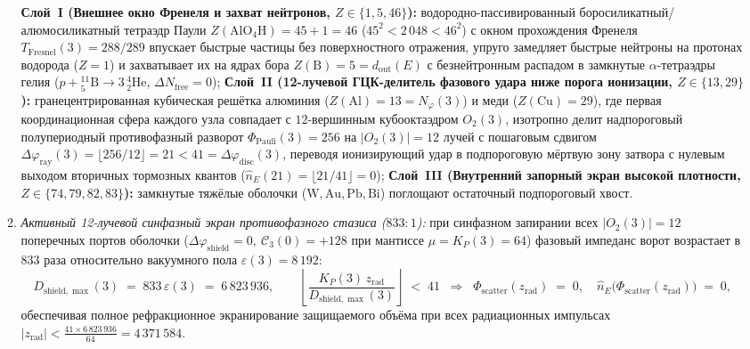 \begin{theorem}[Резонансный замок седла $120 + 8 = 128 = Q_\square(3)$, барьер оболочечной пассивации $45^2 < 2\,048 < 46^2$, окно Френеля $288/289$ и безветвевая кремниевая архитектура в беспотерьном коридоре]
\begin{enumerate}[label=\textbf{(\arabic*)},leftmargin=*]
\begin{enumerate}[label=\textbf{(\alph*)},leftmargin=*]
    \textbf{Слой~I (Внешнее окно Френеля и захват нейтронов, $Z \in \{1, 5, 46\}$):} водородно-пассивированный боросиликатный/алюмосиликатный тетраэдр Паули $Z(\mathrm{AlO_4H}) = 45 + 1 = 46$ ($45^2 < 2\,048 < 46^2$) с окном прохождения Френеля $T_{\mathrm{Fresnel}}(3) = 288/289$ впускает быстрые частицы без поверхностного отражения, упруго замедляет быстрые нейтроны на протонах водорода ($Z = 1$) и захватывает их на ядрах бора $Z(\mathrm{B}) = 5 = d_{\mathrm{out}}(E)$ с безнейтронным распадом в замкнутые $\alpha$-тетраэдры гелия ($p + {}^{11}_5\mathrm{B} \to 3\,{}^4_2\mathrm{He}$, $\Delta N_{\mathrm{free}} = 0$);
    \textbf{Слой~II (12-лучевой ГЦК-делитель фазового удара ниже порога ионизации, $Z \in \{13, 29\}$):} гранецентрированная кубическая решётка алюминия ($Z(\mathrm{Al}) = 13 = N_\varphi(3)$) и меди ($Z(\mathrm{Cu}) = 29$), где первая координационная сфера каждого узла совпадает с $12$-вершинным кубооктаэдром $O_2(3)$, изотропно делит надпороговый полупериодный противофазный разворот $\Phi_{\mathrm{Pauli}}(3) = 256$ на $|O_2(3)| = 12$ лучей с пошаговым сдвигом $\Delta\varphi_{\mathrm{ray}}(3) = \lfloor 256 / 12 \rfloor = 21 < 41 = \Delta\varphi_{\mathrm{disc}}(3)$, переводя ионизирующий удар в подпороговую мёртвую зону затвора с нулевым выходом вторичных тормозных квантов ($\hat{n}_E(21) = \lfloor 21 / 41 \rfloor = 0$);
    \textbf{Слой~III (Внутренний запорный экран высокой плотности, $Z \in \{74, 79, 82, 83\}$):} замкнутые тяжёлые оболочки ($\mathrm{W}, \mathrm{Au}, \mathrm{Pb}, \mathrm{Bi}$) поглощают остаточный подпороговый хвост.
  \item \emph{Активный 12-лучевой синфазный экран противофазного стазиса ($833 : 1$):}
    при синфазном запирании всех $|O_2(3)| = 12$ поперечных портов оболочки ($\Delta\varphi_{\mathrm{shield}} = 0,\ \mathcal{C}_3(0) = +128$ при мантиссе $\mu = K_P(3) = 64$) фазовый импеданс ворот возрастает в $833$ раза относительно вакуумного пола $\varepsilon(3) = 8\,192$:
    \begin{equation}
      \label{eq:mono-radiation-shield-833}
      D_{\mathrm{shield,\max}}(3) \;=\; 833\,\varepsilon(3) \;=\; 6\,823\,936,
      \qquad
      \left\lfloor\frac{K_P(3)\,z_{\mathrm{rad}}}{D_{\mathrm{shield,\max}}(3)}\right\rfloor \;<\; 41
      \;\;\Longrightarrow\;\;
      \Phi_{\mathrm{scatter}}(z_{\mathrm{rad}}) \;=\; 0,
      \quad
      \hat{n}_E\bigl(\Phi_{\mathrm{scatter}}(z_{\mathrm{rad}})\bigr) \;=\; 0,
    \end{equation}
    обеспечивая полное рефракционное экранирование защищаемого объёма при всех радиационных импульсах $|z_{\mathrm{rad}}| < \frac{41 \times 6\,823\,936}{64} = 4\,371\,584$.
  \end{enumerate}
\end{enumerate}
\end{theorem}

